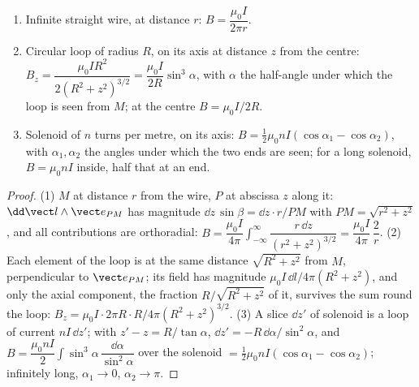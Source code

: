 \begin{proposition}\label{prop:b1:magnetostatics:three}
\begin{enumerate}
  \item Infinite straight wire, at distance $r$: $B = \dfrac{\mu_0I}{2\pi r}$.
  \item Circular loop of radius $R$, on its axis at distance $z$ from
        the centre: $B_z = \dfrac{\mu_0IR^2}{2(R^2 + z^2)^{3/2}} = \dfrac{\mu_0I}{2R}
        \sin^3\alpha$, with $\alpha$ the half-angle under which the loop is
        seen from $M$; at the centre $B = \mu_0I/2R$.
  \item Solenoid of $n$ turns per metre, on its axis: $B = \tfrac12\mu_0nI
        (\cos\alpha_1 - \cos\alpha_2)$, with $\alpha_1, \alpha_2$ the angles under
        which the two ends are seen; for a long solenoid, $B = \mu_0nI$
        inside, half that at an end.
\end{enumerate}
\end{proposition}

\begin{proof}
(1) $M$ at distance $r$ from the wire, $P$ at abscissa $z$ along it:
$\dd\vect l\wedge\vect e_{PM}$ has magnitude $\dd z\,\sin\beta = \dd z\cdot r/PM$
with $PM = \sqrt{r^2 + z^2}$, and all contributions are orthoradial:
$B = \dfrac{\mu_0I}{4\pi}\displaystyle\int_{-\infty}^{\infty}\dfrac{r\,\dd z}{(r^2 + z^2)^{3/2}}
= \dfrac{\mu_0I}{4\pi}\,\dfrac{2}{r}$. (2) Each element of the loop is at
the same distance $\sqrt{R^2 + z^2}$ from $M$, perpendicular to
$\vect e_{PM}$; its field has magnitude $\mu_0I\,\dd l/4\pi(R^2 + z^2)$, and
only the axial component, the fraction $R/\sqrt{R^2 + z^2}$ of it,
survives the sum round the loop: $B_z = \mu_0I\cdot2\pi R\cdot R/4\pi(R^2 +
z^2)^{3/2}$. (3) A slice $\dd z'$ of solenoid is a loop of current
$nI\,\dd z'$; with $z' - z = R/\tan\alpha$, $\dd z' = -R\,\dd\alpha/\sin^2\alpha$,
and $B = \dfrac{\mu_0nI}{2}\displaystyle\int\sin^3\alpha\,\dfrac{\dd\alpha}{\sin^2\alpha}$ over
the solenoid $= \tfrac12\mu_0nI(\cos\alpha_1 - \cos\alpha_2)$; infinitely
long, $\alpha_1 \to 0$, $\alpha_2 \to \pi$.
\end{proof}

